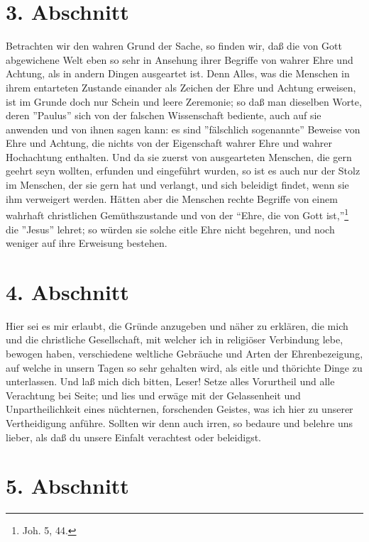 \section{3. Abschnitt}

Betrachten wir den wahren Grund der Sache, so finden wir, daß die von Gott
abgewichene Welt eben so sehr in Ansehung ihrer Begriffe von wahrer Ehre und
Achtung, als in andern Dingen ausgeartet ist. Denn Alles, was die Menschen in
ihrem entarteten Zustande einander als Zeichen der Ehre und Achtung erweisen,
ist im Grunde doch nur Schein und leere Zeremonie; so daß man dieselben Worte,
deren ''Paulus'' sich von der falschen Wissenschaft bediente, auch auf sie
anwenden und von ihnen sagen kann: es sind ''fälschlich sogenannte'' Beweise von
Ehre und Achtung, die nichts von der Eigenschaft wahrer Ehre und wahrer
Hochachtung enthalten. Und da sie zuerst von ausgearteten Menschen, die gern
geehrt seyn wollten, erfunden und eingeführt wurden, so ist es auch nur der
Stolz im Menschen, der sie gern hat und verlangt, und sich beleidigt findet,
wenn sie ihm verweigert werden. Hätten aber die Menschen rechte Begriffe von
einem wahrhaft christlichen Gemüthszustande und von der "`Ehre, die von Gott
ist,"'\footnote{Joh. 5, 44.} die ''Jesus'' lehret; so würden sie solche eitle
Ehre nicht begehren, und noch weniger auf ihre Erweisung bestehen.

\section{4. Abschnitt}

Hier sei es mir erlaubt, die Gründe anzugeben und näher zu erklären, die mich
und die christliche Gesellschaft, mit welcher ich in religiöser Verbindung lebe,
bewogen haben, verschiedene weltliche Gebräuche und Arten der Ehrenbezeigung,
auf welche in unsern Tagen so sehr gehalten wird, als eitle und thörichte Dinge
zu unterlassen. Und laß mich dich bitten, Leser! Setze alles Vorurtheil und alle
Verachtung bei Seite; und lies und erwäge mit der Gelassenheit und
Unpartheilichkeit eines nüchternen, forschenden Geistes, was ich hier zu unserer
Vertheidigung anführe. Sollten wir denn auch irren, so bedaure und belehre uns
lieber, als daß du unsere Einfalt verachtest oder beleidigst.

\section{5. Abschnitt}

